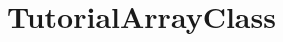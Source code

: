 \hypertarget{group___tutorial_array_class}{}\section{Tutorial\+Array\+Class}
\label{group___tutorial_array_class}
